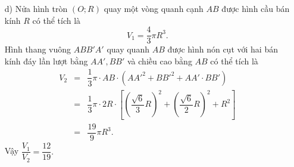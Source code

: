 \begin{bt}
{\begin{enumerate}
			Vậy $x=\dfrac{\sqrt{6}}{3}R$ và $y=\dfrac{\sqrt{6}}{2}R$.
			\item[d)] Nửa hình tròn $ (O;R) $ quay một vòng quanh cạnh $ AB $ được hình cầu bán kính $R$ có thể tích là $$ V_1=\dfrac{4}{3}\pi R^3 .$$
			Hình thang vuông $ ABB'A' $ quay quanh $ AB $ được hình nón cụt với hai bán kính đáy lần lượt bằng $AA', BB'$ và chiều cao bằng $AB$ có thể tích là
			{\allowdisplaybreaks
				\begin{eqnarray*}
					V_2&=&\dfrac{1}{3}\pi\cdot AB\cdot(AA'^2+BB'^2+AA'\cdot BB') \\ &=& \dfrac{1}{3}\pi\cdot 2R\cdot \left[\left(\dfrac{\sqrt{6}}{3}R\right)^2+\left(\dfrac{\sqrt{6}}{2}R\right)^2+R^2\right]\\ &=&\dfrac{19}{9}\pi R^3.
				\end{eqnarray*}
			}
			Vậy $\dfrac{V_1}{V_2}=\dfrac{12}{19}.$
		\end{enumerate}
	}
\end{bt}
